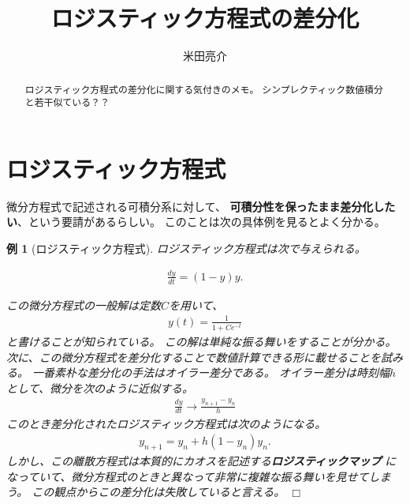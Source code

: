 \documentclass{jsarticle}
\newtheorem{eg}{例}
\def\qed{\hfill $\Box$}
\begin{document}
\title{ロジスティック方程式の差分化}
\author{米田亮介}
\maketitle	

\begin{abstract}
ロジスティック方程式の差分化に関する気付きのメモ。
シンプレクティック数値積分と若干似ている？？
\end{abstract}
\section{ロジスティック方程式}
微分方程式で記述される可積分系に対して、
\textbf{可積分性を保ったまま差分化したい}、という要請があるらしい。
このことは次の具体例を見るとよく分かる。

\begin{eg}[ロジスティック方程式]
ロジスティック方程式は次で与えられる。
\begin{framed}
\begin{align}
\frac{dy}{dt}=(1-y)y.
\end{align}
\end{framed}
この微分方程式の一般解は定数$C$を用いて、
\begin{align}
y(t)=\frac{1}{1+Ce^{-t}}
\end{align}
と書けることが知られている。
この解は単純な振る舞いをすることが分かる。
次に、この微分方程式を差分化することで数値計算できる形に載せることを試みる。
一番素朴な差分化の手法はオイラー差分である。
オイラー差分は時刻幅$h$として、微分を次のように近似する。
\begin{align}
\frac{dy}{dt}\longrightarrow\frac{y_{n+1}-y_{n}}{h}
\end{align}
このとき差分化されたロジスティック方程式は次のようになる。
\begin{align}
y_{n+1}=y_{n}+h(1-y_{n})y_{n}.
\end{align}
しかし、この離散方程式は本質的にカオスを記述する\textbf{ロジスティックマップ}
になっていて、微分方程式のときと異なって非常に複雑な振る舞いを見せてしまう。
この観点からこの差分化は失敗していると言える。
\qed\end{eg}
\end{document}
